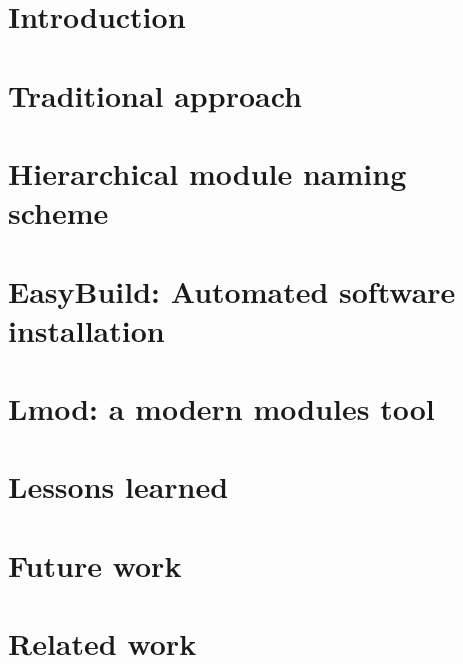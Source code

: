 \documentclass[conference, compsocconf]{IEEEtran}
\newcommand{\easybuild}{EasyBuild}
\begin{document}
%
\IEEEpeerreviewmaketitle



\section{Introduction}\label{sec:intro}


\section{Traditional approach}
\label{sec:traditional}


\section{Hierarchical module naming scheme}
\label{sec:hierarchical}


\section{\easybuild{}: Automated software installation}
\label{sec:easybuild}


\section{Lmod: a modern modules tool}
\label{sec:lmod}


\section{Lessons learned}
\label{sec:lessons}


\section{Future work}
\label{sec:future_work}


\section{Related work}
\label{sec:related_work}

\end{document}
